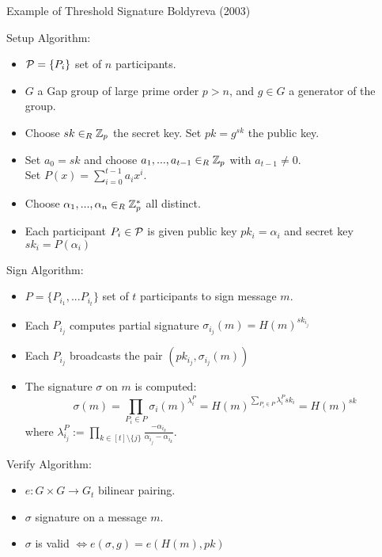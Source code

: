 \begin{frame}{Example of Threshold Signature}
Boldyreva (2003)

Setup Algorithm:
\begin{itemize}
\item ${\mathcal P}=\{P_i\}$ set of $n$ participants.
\item $G$ a Gap group of large prime order $p > n$, and $g \in G$ a generator of the group.
\item Choose $sk \in_R {\mathbb Z}_p$ the secret key. Set $pk = g^{sk}$ the public key.
\item Set $a_0 = sk$ and choose $a_1, ..., a_{t-1} \in_R {\mathbb Z}_p$ with $a_{t-1} \neq 0$. \\
        Set $P(x) = \sum_{i=0}^{t-1} a_i x^i$.
\item Choose $\alpha_1, ..., \alpha_n \in_R {\mathbb Z}_p^\ast$ all distinct.
\item Each participant $P_i \in {\mathcal P}$ is given public key $pk_i = \alpha_i$ and secret key $sk_i = P(\alpha_i)$
\end{itemize}

\end{frame}

\begin{frame}
Sign Algorithm:
\begin{itemize}
\item $P = \{P_{i_1}, ... P_{i_t} \}$ set of $t$ participants to sign message $m$.
\item Each $P_{i_j}$ computes partial signature $\sigma_{i_j}(m) = H(m)^{sk_{i_j}}$
\item Each $P_{i_j}$ broadcasts the pair $(pk_{i_j}, \sigma_{i_j}(m))$
\item The signature $\sigma$ on $m$ is computed:
$$ \sigma(m) = \prod_{P_i \in P} \sigma_i (m)^{\lambda_i^{P}}= H(m)^{\sum_{P_i \in P} \lambda_i^P sk_i} = H(m)^{sk}$$
where $\lambda_{i_j}^P := \prod_{k \in [t] \setminus \{j\}} \frac{-\alpha_{i_k}}{\alpha_{i_j} - \alpha_{i_k}}$.
\end{itemize}
\end{frame}

\begin{frame}
Verify Algorithm:
\begin{itemize}
\item $e: G \times G \rightarrow G_t$ bilinear pairing.
\item $\sigma$ signature on a message $m$.
\item $\sigma$ is valid $\Leftrightarrow e(\sigma,g) = e(H(m),pk)$ 
\end{itemize}
\end{frame}